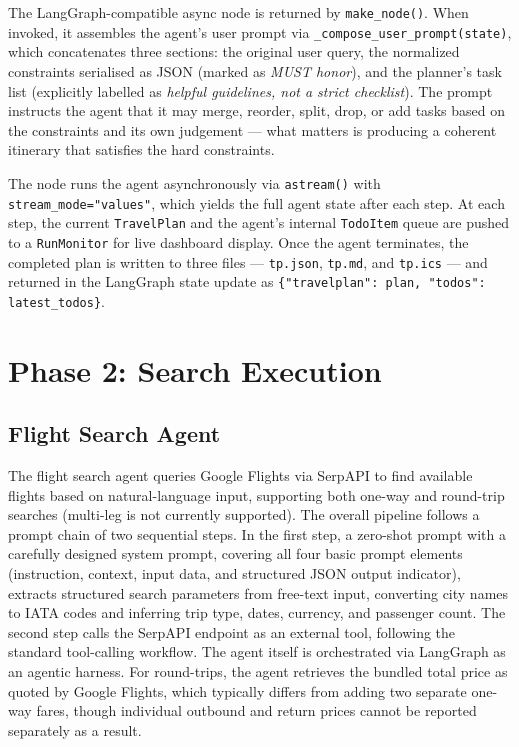 \documentclass[a4paper,oneside,bibliography=totoc]{scrbook}
\begin{document}
The LangGraph-compatible async node is returned by \texttt{make\_node()}.
When invoked, it assembles the agent's user prompt via
\texttt{\_compose\_user\_prompt(state)}, which concatenates three sections:
the original user query, the normalized constraints serialised as JSON
(marked as \emph{MUST honor}), and the planner's task list (explicitly
labelled as \emph{helpful guidelines, not a strict checklist}).
The prompt instructs the agent that it may merge, reorder, split, drop, or
add tasks based on the constraints and its own judgement --- what matters is
producing a coherent itinerary that satisfies the hard constraints.

The node runs the agent asynchronously via \texttt{astream()} with
\texttt{stream\_mode="values"}, which yields the full agent state after each
step. At each step, the current \texttt{TravelPlan} and the agent's internal
\texttt{TodoItem} queue are pushed to a \texttt{RunMonitor} for live
dashboard display. Once the agent terminates, the completed plan is written
to three files --- \texttt{tp.json}, \texttt{tp.md}, and \texttt{tp.ics} ---
and returned in the LangGraph state update as
\texttt{\{"travelplan": plan, "todos": latest\_todos\}}.

\section{Phase 2: Search Execution}
\label{sec:system:search}

\subsection{Flight Search Agent}
\label{sec:system:search:flight}
The flight search agent queries Google Flights via SerpAPI to find available flights based on natural-language input, supporting both one-way and round-trip searches (multi-leg is not currently supported). The overall pipeline follows a prompt chain of two sequential steps. In the first step, a zero-shot prompt with a carefully designed system prompt, covering all four basic prompt elements (instruction, context, input data, and structured JSON output indicator), extracts structured search parameters from free-text input, converting city names to IATA codes and inferring trip type, dates, currency, and passenger count. The second step calls the SerpAPI endpoint as an external tool, following the standard tool-calling workflow. The agent itself is orchestrated via LangGraph as an agentic harness. For round-trips, the agent retrieves the bundled total price as quoted by Google Flights, which typically differs from adding two separate one-way fares, though individual outbound and return prices cannot be reported separately as a result.
\end{document}
